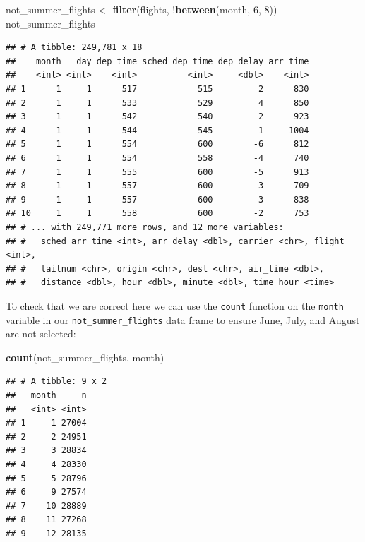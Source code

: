 \documentclass[]{tufte-book}
\newenvironment{Shaded}{\begin{snugshade}}{\end{snugshade}}
\newcommand{\KeywordTok}[1]{\textcolor[rgb]{0.13,0.29,0.53}{\textbf{{#1}}}}
\newcommand{\DecValTok}[1]{\textcolor[rgb]{0.00,0.00,0.81}{{#1}}}
\newcommand{\StringTok}[1]{\textcolor[rgb]{0.31,0.60,0.02}{{#1}}}
\newcommand{\NormalTok}[1]{{#1}}
\begin{document}
\begin{Shaded}
\begin{Highlighting}[]
\NormalTok{not_summer_flights <-}\StringTok{ }\KeywordTok{filter}\NormalTok{(flights,}
                             \NormalTok{!}\KeywordTok{between}\NormalTok{(month, }\DecValTok{6}\NormalTok{, }\DecValTok{8}\NormalTok{))}
\NormalTok{not_summer_flights}
\end{Highlighting}
\end{Shaded}

\begin{verbatim}
## # A tibble: 249,781 x 18
##    month   day dep_time sched_dep_time dep_delay arr_time
##    <int> <int>    <int>          <int>     <dbl>    <int>
## 1      1     1      517            515         2      830
## 2      1     1      533            529         4      850
## 3      1     1      542            540         2      923
## 4      1     1      544            545        -1     1004
## 5      1     1      554            600        -6      812
## 6      1     1      554            558        -4      740
## 7      1     1      555            600        -5      913
## 8      1     1      557            600        -3      709
## 9      1     1      557            600        -3      838
## 10     1     1      558            600        -2      753
## # ... with 249,771 more rows, and 12 more variables:
## #   sched_arr_time <int>, arr_delay <dbl>, carrier <chr>, flight <int>,
## #   tailnum <chr>, origin <chr>, dest <chr>, air_time <dbl>,
## #   distance <dbl>, hour <dbl>, minute <dbl>, time_hour <time>
\end{verbatim}

To check that we are correct here we can use the \texttt{count} function
on the \texttt{month} variable in our \texttt{not\_summer\_flights} data
frame to ensure June, July, and August are not selected:

\begin{Shaded}
\begin{Highlighting}[]
\KeywordTok{count}\NormalTok{(not_summer_flights, month)}
\end{Highlighting}
\end{Shaded}

\begin{verbatim}
## # A tibble: 9 x 2
##   month     n
##   <int> <int>
## 1     1 27004
## 2     2 24951
## 3     3 28834
## 4     4 28330
## 5     5 28796
## 6     9 27574
## 7    10 28889
## 8    11 27268
## 9    12 28135
\end{verbatim}
\end{document}
